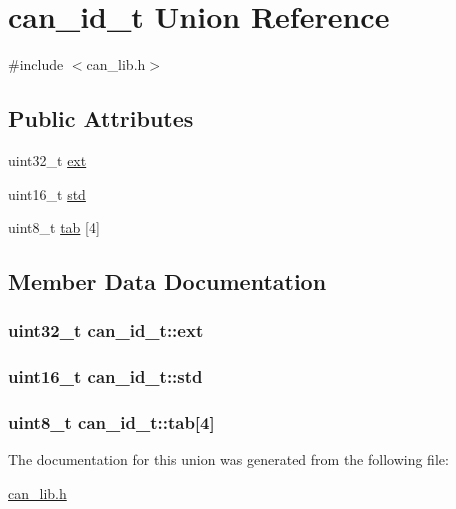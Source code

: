 \hypertarget{unioncan__id__t}{}\section{can\+\_\+id\+\_\+t Union Reference}
\label{unioncan__id__t}


{\ttfamily \#include $<$can\+\_\+lib.\+h$>$}

\subsection*{Public Attributes}
\begin{DoxyCompactItemize}
\item 
uint32\+\_\+t \hyperlink{unioncan__id__t_abbf75e8eafbe3e039971954c190f20b5}{ext}
\item 
uint16\+\_\+t \hyperlink{unioncan__id__t_a162956ceb7b9b1f4667cf5183cb8e0be}{std}
\item 
uint8\+\_\+t \hyperlink{unioncan__id__t_a5ae80931bf020a79e4fa3d90883c4fd9}{tab} \mbox{[}4\mbox{]}
\end{DoxyCompactItemize}


\subsection{Member Data Documentation}
\subsubsection[{\texorpdfstring{ext}{ext}}]{\setlength{\rightskip}{0pt plus 5cm}uint32\+\_\+t can\+\_\+id\+\_\+t\+::ext}\hypertarget{unioncan__id__t_abbf75e8eafbe3e039971954c190f20b5}{}\label{unioncan__id__t_abbf75e8eafbe3e039971954c190f20b5}
\subsubsection[{\texorpdfstring{std}{std}}]{\setlength{\rightskip}{0pt plus 5cm}uint16\+\_\+t can\+\_\+id\+\_\+t\+::std}\hypertarget{unioncan__id__t_a162956ceb7b9b1f4667cf5183cb8e0be}{}\label{unioncan__id__t_a162956ceb7b9b1f4667cf5183cb8e0be}
\subsubsection[{\texorpdfstring{tab}{tab}}]{\setlength{\rightskip}{0pt plus 5cm}uint8\+\_\+t can\+\_\+id\+\_\+t\+::tab\mbox{[}4\mbox{]}}\hypertarget{unioncan__id__t_a5ae80931bf020a79e4fa3d90883c4fd9}{}\label{unioncan__id__t_a5ae80931bf020a79e4fa3d90883c4fd9}


The documentation for this union was generated from the following file\+:\begin{DoxyCompactItemize}
\item 
\hyperlink{can__lib_8h}{can\+\_\+lib.\+h}\end{DoxyCompactItemize}
